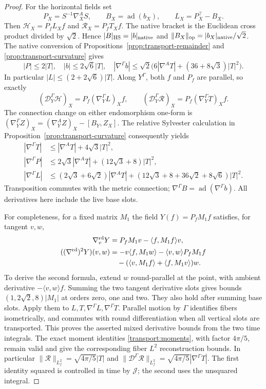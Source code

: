 \documentclass[11pt]{article}
\numberwithin{equation}{section}
\theoremstyle{definition}
\theoremstyle{remark}
\begin{document}
\begin{proof}
For the horizontal fields set
\[
 P_X=S^{-1}\nabla_X^AS,\qquad
 B_X=\operatorname{ad}(b_X),\qquad L_X=P_X^\top-B_X .
\]
Then \(\mathcal H_X=P_fL_Xf\) and
\(\mathcal R_X=P_fT_Xf\).
The native bracket is the Euclidean cross product
divided by \(\sqrt2\). Hence
\(|B|_{\rm HS}=|b|_{\rm native}\) and
\(\|B_X\|_{\rm op}=|b_X|_{\rm native}/\sqrt2\).
The native conversion of
Propositions~\ref{prop:transport-remainder}
and \ref{prop:transport-curvature} gives
\[
 |P|\le2|T|,\quad |b|\le2\sqrt6|T|,\quad
 |\nabla^\Gamma b|\le
 \sqrt2\bigl(6|\nabla^AT|+(36+8\sqrt3)|T|^2\bigr).
\]
In particular \(|L|\le(2+2\sqrt6)|T|\).
Along \(Y^\Gamma\), both \(f\) and \(P_f\) are parallel,
so exactly
\[
 (\mathcal D_Y^\Gamma\mathcal H)_X
        =P_f(\nabla_Y^\Gamma L)_Xf,\qquad
 (\mathcal D_Y^\Gamma\mathcal R)_X
        =P_f(\nabla_Y^\Gamma T)_Xf .
\]
The connection change on either endomorphism one-form is
\((\nabla_Y^\Gamma Z)_X=(\nabla_Y^AZ)_X-[B_Y,Z_X]\).
The relative Sylvester calculation in
Proposition~\ref{prop:transport-curvature} consequently yields
\[
 \begin{split}
 |\nabla^\Gamma T|&\le|\nabla^AT|+4\sqrt3|T|^2,\\
 |\nabla^\Gamma P|&\le
     2\sqrt3|\nabla^AT|+(12\sqrt3+8)|T|^2,\\
 |\nabla^\Gamma L|&\le
     (2\sqrt3+6\sqrt2)|\nabla^AT|
       +(12\sqrt3+8+36\sqrt2+8\sqrt6)|T|^2 .
 \end{split}
\]
Transposition commutes with the metric connection;
\(\nabla^\Gamma B=\operatorname{ad}(\nabla^\Gamma b)\).
All derivatives here include the live base slots.

For completeness, for a fixed matrix \(M_1\) the field
\(Y(f)=P_fM_1f\) satisfies, for tangent \(v,w\),
\[
 \begin{split}
 \nabla_v^{\rm rd}Y&=P_fM_1v-\langle f,M_1f\rangle v,\\
 ((\nabla^{\rm rd})^2Y)(v,w)
 &=-v\langle f,M_1w\rangle-\langle v,w\rangle P_fM_1f\\
 &\quad-(\langle v,M_1f\rangle+\langle f,M_1v\rangle)w .
 \end{split}
\]
To derive the second formula, extend \(w\) round-parallel
at the point, with ambient derivative
\(-\langle v,w\rangle f\). Summing the two tangent
derivative slots gives bounds
\((1,2\sqrt2,8)|M_1|\) at orders zero, one and two.
They also hold after summing base slots. Apply them to
\(L,T,\nabla^\Gamma L,\nabla^\Gamma T\).
Parallel motion by \(\Gamma\) identifies fibers
isometrically, and commutes with round differentiation
when all vertical slots are transported. This proves
the asserted mixed derivative bounds from the two
time integrals. The exact moment identities
\eqref{transport:moments}, with factor \(4\pi/5\),
remain valid and give the corresponding fiber \(L^2\)
reconstruction bounds.
In particular
\(\|\mathcal R\|_{L^2_f}=\sqrt{4\pi/5}|T|\) and
\(\|\mathcal D^\Gamma\mathcal R\|_{L^2_f}
=\sqrt{4\pi/5}|\nabla^\Gamma T|\).
The first identity squared is controlled in time by
\(\mathcal J\); the second uses the unsquared integral.


\end{proof}
\end{document}
